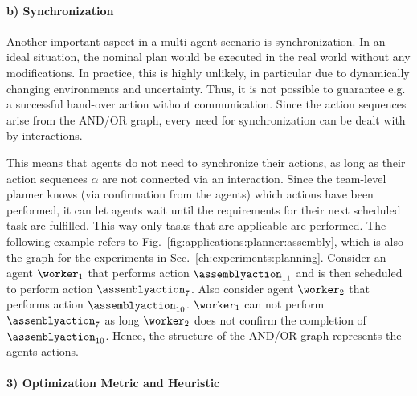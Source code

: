 \paragraph{b) Synchronization}

Another important aspect in a multi-agent scenario is synchronization.
In an ideal situation, the nominal plan would be executed in the real world without any modifications.
In practice, this is highly unlikely, in particular due to dynamically changing environments and uncertainty.
Thus, it is not possible to guarantee e.g. a successful hand-over action without communication.
Since the action sequences arise from the AND/OR graph, every need for synchronization can be dealt with by interactions.

This means that agents do not need to synchronize their actions, as long as their action sequences $\alpha$ are not connected via an interaction.
Since the team-level planner knows (via confirmation from the agents) which actions have been performed, it can let agents wait until the requirements for their next scheduled task are fulfilled.
This way only tasks that are applicable are performed.
The following example refers to Fig.~\ref{fig:applications:planner:assembly}, which is also the graph for the experiments in Sec.~\ref{ch:experiments:planning}.
Consider an agent $\worker_1$ that performs action $\assemblyaction_{11}$ and is then scheduled to perform action $\assemblyaction_7$.
Also consider agent $\worker_2$ that performs action $\assemblyaction_{10}$.
$\worker_1$ can not perform $\assemblyaction_7$ as long $\worker_2$ does not confirm the completion of $\assemblyaction_{10}$.
Hence, the structure of the AND/OR graph represents the agents actions.

\paragraph{3) Optimization Metric and Heuristic}

